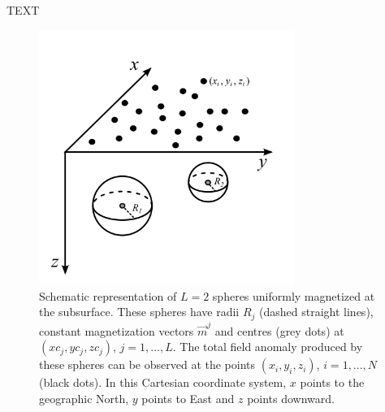 \documentclass[journal abbreviation, npg]{copernicus}
\begin{document}
\begin{acknowledgements}
TEXT
\end{acknowledgements}









\begin{figure}[t]
\vspace*{2mm}
\begin{center}
\includegraphics[width=8.3cm]{Figures/Fig1.png}
\end{center}
\caption{Schematic representation of $L = 2$ spheres uniformly magnetized at the subsurface. These spheres have radii $R_{j}$ (dashed straight lines), constant magnetization vectors $\vec{m}^{j}$ and centres (grey dots) at $(xc_{j}, yc_{j}, zc_{j})$, $j = 1, ..., L$. The total field anomaly produced by these spheres can be observed at the points $(x_{i}, y_{i}, z_{i})$, $i = 1, ..., N$ (black dots). In this Cartesian coordinate system, $x$ points to the geographic North, $y$ points to East and $z$ points downward.}
\label{fig:geometric-aspects}
\end{figure}
\end{document}
